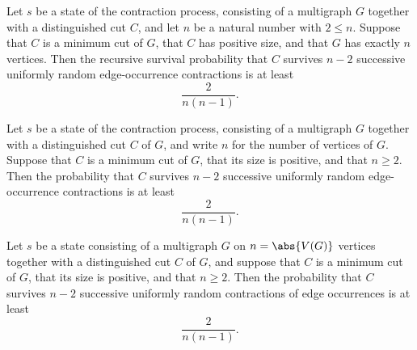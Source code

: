 \begin{theorem}
\label{KargerTrace.survivalEventProb_lower_bound}
\leanok
{}
Let $s$ be a state of the contraction process, consisting of a multigraph $G$ together
with a distinguished cut $C$, and let $n$ be a natural number with $2 \le n$. Suppose
that $C$ is a minimum cut of $G$, that $C$ has positive size, and that $G$ has exactly
$n$ vertices. Then the recursive survival probability that $C$ survives $n-2$ successive
uniformly random edge-occurrence contractions is at least
\[
  \frac{2}{n(n-1)}.
\]
\end{theorem}

\begin{theorem}
\label{KargerTrace.survivalEventProb_initial_lower_bound}
\leanok
{}
Let $s$ be a state of the contraction process, consisting of a multigraph $G$ together
with a distinguished cut $C$ of $G$, and write $n$ for the number of vertices of $G$.
Suppose that $C$ is a minimum cut of $G$, that its size is positive, and that $n \ge 2$.
Then the probability that $C$ survives $n-2$ successive uniformly random edge-occurrence
contractions is at least
\[
  \frac{2}{n(n-1)}.
\]
\end{theorem}

\begin{theorem}
\label{KargerTrace.fixed_mincut_survival_probability_lower_bound}
\leanok
{}
Let $s$ be a state consisting of a multigraph $G$ on $n = \abs{V(G)}$ vertices together
with a distinguished cut $C$ of $G$, and suppose that $C$ is a minimum cut of $G$, that
its size is positive, and that $n \ge 2$. Then the probability that $C$ survives $n-2$
successive uniformly random contractions of edge occurrences is at least
\[
\frac{2}{n(n-1)}.
\]
\end{theorem}

